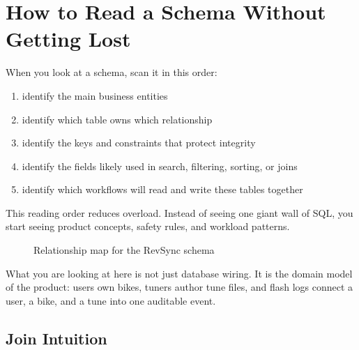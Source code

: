 \documentclass[12pt, a4paper, oneside]{book}
\begin{document}
\section{How to Read a Schema Without Getting Lost}

When you look at a schema, scan it in this order:
\begin{enumerate}[leftmargin=2em]
    \item identify the main business entities
    \item identify which table owns which relationship
    \item identify the keys and constraints that protect integrity
    \item identify the fields likely used in search, filtering, sorting, or joins
    \item identify which workflows will read and write these tables together
\end{enumerate}

\begin{notebox}
This reading order reduces overload. Instead of seeing one giant wall of SQL, you start seeing product concepts, safety rules, and workload patterns.
\end{notebox}

\begin{figure}[H]
\centering
{}
\caption{Relationship map for the RevSync schema}
\label{fig:revsync-schema-relationships}
\end{figure}

What you are looking at here is not just database wiring. It is the domain model of the product: users own bikes, tuners author tune files, and flash logs connect a user, a bike, and a tune into one auditable event.

\subsection{Join Intuition}
\end{document}
